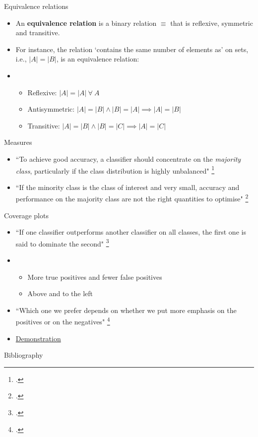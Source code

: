 \documentclass[10pt]{beamer}
\begin{document}
\begin{frame}{Equivalence relations}
	\begin{itemize}
		\item An \textbf{equivalence relation} is a binary relation $\equiv$ that is reflexive, symmetric and transitive.
		\item For instance, the relation `contains the same number of elements as' on sets, i.e., $\lvert A \rvert = \lvert B \rvert$, is an equivalence relation:
		\item[] \begin{itemize}
			      \item[\checkmark]
			            Reflexive:
			            $\lvert A \rvert = \lvert A \rvert\ \forall\ A$
			      \item[\checkmark]
			            Antisymmetric:
			            $\lvert A \rvert = \lvert B \rvert \land \lvert B \rvert = \lvert A \rvert \implies \lvert A \rvert = \lvert B \rvert$
			      \item[\checkmark]
			            Transitive:
			            $\lvert A \rvert = \lvert B \rvert \land \lvert B \rvert = \lvert C \rvert \implies \lvert A \rvert = \lvert C \rvert$
		      \end{itemize}
	\end{itemize}
\end{frame}

\begin{frame}{Measures}
	\begin{itemize}
		\item ``To achieve good accuracy, a classifier should concentrate on the \textit{majority class}, particularly if the class distribution is highly unbalanced"
		      \footcite[p.56]{Flach2012}
		\item ``If the minority class is the class of interest and very small, accuracy and performance on the majority class are not the right quantities to optimise"
		      \footcite[p.57]{Flach2012}
	\end{itemize}
\end{frame}

\begin{frame}{Coverage plots}
	\begin{itemize}
		\item ``If one classifier outperforms another classifier on all classes, the first one is said to dominate the second"
		      \footcite[p.59]{Flach2012}
		\item[] \begin{itemize}
			      \item More true positives and fewer false positives
			      \item Above and to the left
		      \end{itemize}
		\item ``Which one we prefer depends on whether we put more emphasis on the positives or on the negatives"
		      \footcite[p.59]{Flach2012}
		\item \href{https://coverage-plots.vercel.app/}{Demonstration}
	\end{itemize}
\end{frame}

\begin{frame}{Bibliography}
	\printbibliography
\end{frame}
\end{document}
